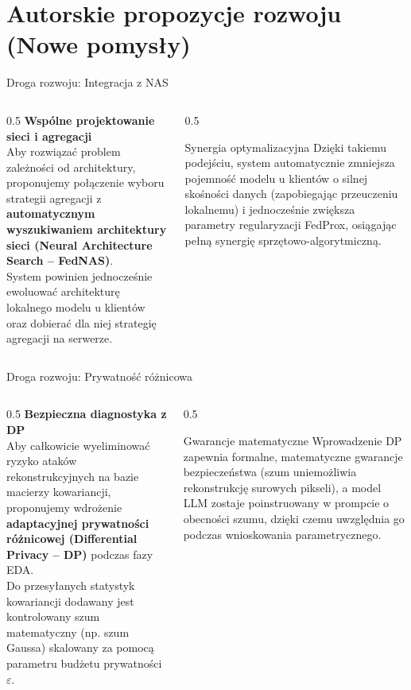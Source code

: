 \documentclass[9pt,aspectratio=169]{beamer}
\newcommand{\sekcjaaktualna}{}
\newcommand{\ustawsekcje}[1]{\renewcommand{\sekcjaaktualna}{#1}}
\begin{document}
\ustawsekcje{Sekcja 4: Autorskie propozycje rozwoju (Nowe pomysły)}
\section{Autorskie propozycje rozwoju (Nowe pomysły)}

\begin{frame}{Droga rozwoju: Integracja z NAS}
\begin{columns}[T]
\begin{column}{0.5\textwidth}
\textbf{Wspólne projektowanie sieci i agregacji}\\[4pt]
Aby rozwiązać problem zależności od architektury, proponujemy połączenie wyboru strategii agregacji z \textbf{automatycznym wyszukiwaniem architektury sieci (Neural Architecture Search -- FedNAS)}.\\[6pt]
System powinien jednocześnie ewoluować architekturę lokalnego modelu u klientów oraz dobierać dla niej strategię agregacji na serwerze.
\end{column}
\begin{column}{0.5\textwidth}
\begin{infoboxgreen}{Synergia optymalizacyjna}
Dzięki takiemu podejściu, system automatycznie zmniejsza pojemność modelu u klientów o silnej skośności danych (zapobiegając przeuczeniu lokalnemu) i jednocześnie zwiększa parametry regularyzacji FedProx, osiągając pełną synergię sprzętowo-algorytmiczną.
\end{infoboxgreen}
\end{column}
\end{columns}
\end{frame}

\begin{frame}{Droga rozwoju: Prywatność różnicowa}
\begin{columns}[T]
\begin{column}{0.5\textwidth}
\textbf{Bezpieczna diagnostyka z DP}\\[4pt]
Aby całkowicie wyeliminować ryzyko ataków rekonstrukcyjnych na bazie macierzy kowariancji, proponujemy wdrożenie \textbf{adaptacyjnej prywatności różnicowej (Differential Privacy -- DP)} podczas fazy EDA.\\[6pt]
Do przesyłanych statystyk kowariancji dodawany jest kontrolowany szum matematyczny (np. szum Gaussa) skalowany za pomocą parametru budżetu prywatności $\varepsilon$.
\end{column}
\begin{column}{0.5\textwidth}
\begin{infoboxgreen}{Gwarancje matematyczne}
Wprowadzenie DP zapewnia formalne, matematyczne gwarancje bezpieczeństwa (szum uniemożliwia rekonstrukcję surowych pikseli), a model LLM zostaje poinstruowany w prompcie o obecności szumu, dzięki czemu uwzględnia go podczas wnioskowania parametrycznego.
\end{infoboxgreen}
\end{column}
\end{columns}
\end{frame}
\end{document}
